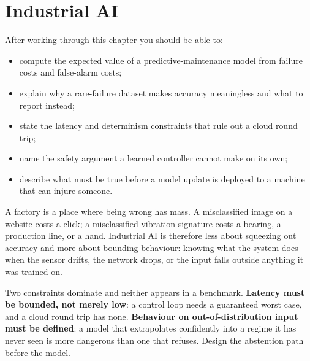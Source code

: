 
\chapter{Industrial AI}


\label{ch:industrial-ai}

\begin{learningobjectives}
After working through this chapter you should be able to:
\begin{itemize}
  \item compute the expected value of a predictive-maintenance model from
        failure costs and false-alarm costs;
  \item explain why a rare-failure dataset makes accuracy meaningless and what
        to report instead;
  \item state the latency and determinism constraints that rule out a
        cloud round trip;
  \item name the safety argument a learned controller cannot make on its own;
  \item describe what must be true before a model update is deployed to a
        machine that can injure someone.
\end{itemize}
\end{learningobjectives}

\begin{plainlanguage}
A factory is a place where being wrong has mass. A misclassified image on a
website costs a click; a misclassified vibration signature costs a bearing, a
production line, or a hand. Industrial AI is therefore less about squeezing out
accuracy and more about bounding behaviour: knowing what the system does when
the sensor drifts, the network drops, or the input falls outside anything it
was trained on.
\end{plainlanguage}

\begin{engineernote}
Two constraints dominate and neither appears in a benchmark. \textbf{Latency
must be bounded, not merely low}: a control loop needs a guaranteed worst case,
and a cloud round trip has none. \textbf{Behaviour on out-of-distribution input
must be defined}: a model that extrapolates confidently into a regime it has
never seen is more dangerous than one that refuses. Design the abstention path
before the model.
\end{engineernote}

